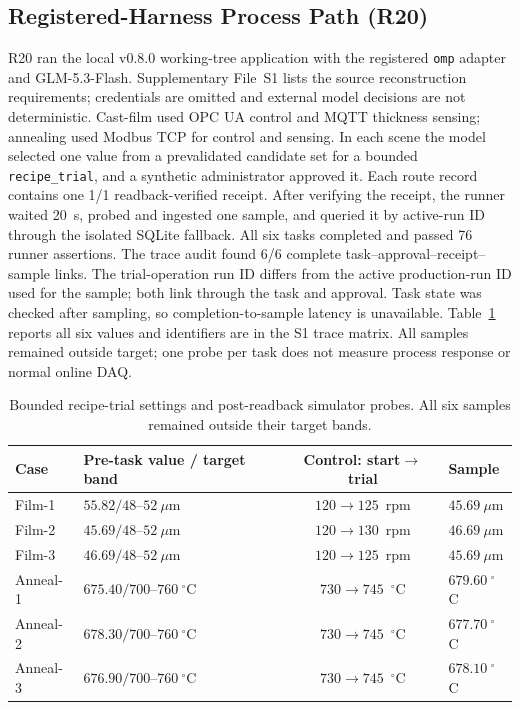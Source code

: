 \subsection{Registered-Harness Process Path (R20)}
\label{sec:harness-e2e}
R20 ran the local v0.8.0 working-tree application with the registered
\texttt{omp} adapter and GLM-5.3-Flash. Supplementary File~S1 lists the source
reconstruction requirements; credentials are omitted and external model
decisions are not deterministic. Cast-film used OPC UA control and MQTT
thickness sensing; annealing used Modbus TCP for control and sensing. In each
scene the model selected one value from a prevalidated candidate set for a
bounded \texttt{recipe\_trial}, and a synthetic administrator approved it.
Each route record contains one 1/1 readback-verified receipt. After verifying
the receipt, the runner waited 20~s, probed and ingested one sample, and queried
it by active-run ID through the isolated SQLite fallback. All six tasks
completed and passed 76 runner assertions. The trace audit found 6/6 complete
task--approval--receipt--sample links. The trial-operation run ID differs from
the active production-run ID used for the sample; both link through the task
and approval. Task state was checked after sampling, so completion-to-sample
latency is unavailable. Table~\ref{tab:q8} reports all six values and
identifiers are in the S1 trace matrix. All samples remained outside target;
one probe per task does not measure process response or normal online DAQ.

\begin{table}[!t]
\centering
\caption{Bounded recipe-trial settings and post-readback simulator probes. All
six samples remained outside their target bands.}
\label{tab:q8}
\footnotesize
\setlength{\tabcolsep}{2.5pt}
\begin{tabularx}{\columnwidth}{@{}lXcX@{}}
\toprule
Case & Pre-task value / target band & Control: start$\to$trial & Sample \\
\midrule
Film-1 & $55.82/48$--$52~\mu$m & $120\to125$~rpm & $45.69~\mu$m \\
Film-2 & $45.69/48$--$52~\mu$m & $120\to130$~rpm & $46.69~\mu$m \\
Film-3 & $46.69/48$--$52~\mu$m & $120\to125$~rpm & $45.69~\mu$m \\
Anneal-1 & $675.40/700$--$760~^{\circ}$C & $730\to745$~$^{\circ}$C & $679.60~^{\circ}$C \\
Anneal-2 & $678.30/700$--$760~^{\circ}$C & $730\to745$~$^{\circ}$C & $677.70~^{\circ}$C \\
Anneal-3 & $676.90/700$--$760~^{\circ}$C & $730\to745$~$^{\circ}$C & $678.10~^{\circ}$C \\
\bottomrule
\end{tabularx}
\end{table}

